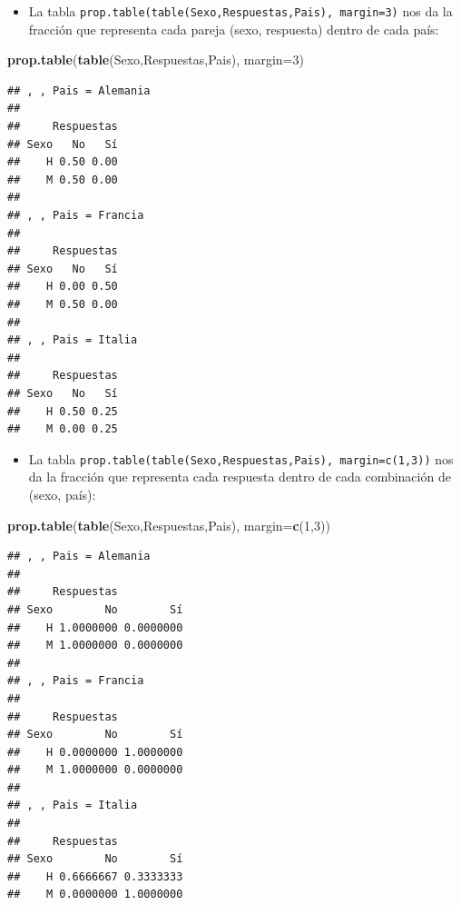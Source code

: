 \documentclass[]{book}
\newenvironment{Shaded}{\begin{snugshade}}{\end{snugshade}}
\newcommand{\DataTypeTok}[1]{\textcolor[rgb]{0.13,0.29,0.53}{#1}}
\newcommand{\DecValTok}[1]{\textcolor[rgb]{0.00,0.00,0.81}{#1}}
\newcommand{\KeywordTok}[1]{\textcolor[rgb]{0.13,0.29,0.53}{\textbf{#1}}}
\newcommand{\NormalTok}[1]{#1}
\providecommand{\tightlist}{%
  \setlength{\itemsep}{0pt}\setlength{\parskip}{0pt}}
\theoremstyle{definition}
\theoremstyle{definition}
\theoremstyle{definition}
\theoremstyle{remark}
\begin{document}
\begin{itemize}
\tightlist
\item
  La tabla \texttt{prop.table(table(Sexo,Respuestas,Pais),\ margin=3)} nos da la fracción que representa cada pareja (sexo, respuesta) dentro de cada país:
\end{itemize}

\begin{Shaded}
\begin{Highlighting}[]
\KeywordTok{prop.table}\NormalTok{(}\KeywordTok{table}\NormalTok{(Sexo,Respuestas,Pais), }\DataTypeTok{margin=}\DecValTok{3}\NormalTok{)}
\end{Highlighting}
\end{Shaded}

\begin{verbatim}
## , , Pais = Alemania
## 
##     Respuestas
## Sexo   No   Sí
##    H 0.50 0.00
##    M 0.50 0.00
## 
## , , Pais = Francia
## 
##     Respuestas
## Sexo   No   Sí
##    H 0.00 0.50
##    M 0.50 0.00
## 
## , , Pais = Italia
## 
##     Respuestas
## Sexo   No   Sí
##    H 0.50 0.25
##    M 0.00 0.25
\end{verbatim}

\begin{itemize}
\tightlist
\item
  La tabla \texttt{prop.table(table(Sexo,Respuestas,Pais),\ margin=c(1,3))} nos da la fracción que representa cada respuesta dentro de cada combinación de (sexo, país):
\end{itemize}

\begin{Shaded}
\begin{Highlighting}[]
\KeywordTok{prop.table}\NormalTok{(}\KeywordTok{table}\NormalTok{(Sexo,Respuestas,Pais), }\DataTypeTok{margin=}\KeywordTok{c}\NormalTok{(}\DecValTok{1}\NormalTok{,}\DecValTok{3}\NormalTok{))}
\end{Highlighting}
\end{Shaded}

\begin{verbatim}
## , , Pais = Alemania
## 
##     Respuestas
## Sexo        No        Sí
##    H 1.0000000 0.0000000
##    M 1.0000000 0.0000000
## 
## , , Pais = Francia
## 
##     Respuestas
## Sexo        No        Sí
##    H 0.0000000 1.0000000
##    M 1.0000000 0.0000000
## 
## , , Pais = Italia
## 
##     Respuestas
## Sexo        No        Sí
##    H 0.6666667 0.3333333
##    M 0.0000000 1.0000000
\end{verbatim}
\end{document}
